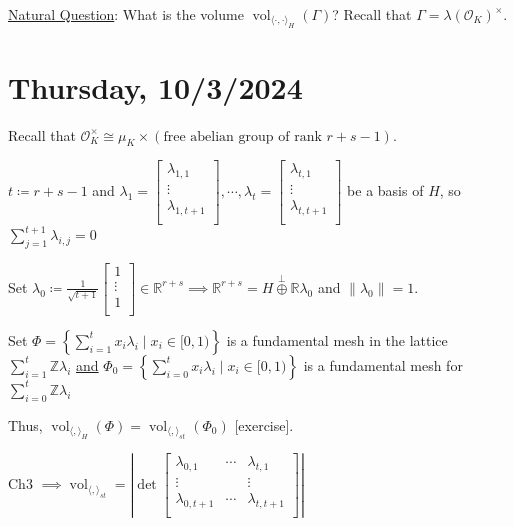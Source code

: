 \documentclass[openany]{amsbook}
\numberwithin{section}{chapter}
\theoremstyle{definition}
\begin{document}
\underline{Natural Question}: What is the volume \(\operatorname{vol}_{\langle \cdot,\cdot \rangle_H}(\Gamma)\)? Recall that \(\Gamma = \lambda (\mathcal{O}_K)^\times\). 

\section*{Thursday, 10/3/2024}

Recall that \(\mathcal{O}_K^\times \cong \mu_K \times (\text{free abelian group of rank } r+s-1)\).

\begin{center}



\end{center}

\(t\coloneqq r+s-1\) and \(\lambda_1 = \begin{bmatrix}
     \lambda_{1,1} \\
     \vdots \\
     \lambda_{1,t+1} \\
\end{bmatrix}, \cdots , \lambda _t = \begin{bmatrix}
     \lambda_{t,1} \\
     \vdots \\
     \lambda_{t,t+1} \\
\end{bmatrix}\) be a basis of \(H\), so \(\sum_{j=1}^{t+1} \lambda_{i,j} = 0 \)  

Set \(\lambda_0 \coloneqq \frac{1}{\sqrt{t+1}} \begin{bmatrix}
     1 \\
     \vdots \\
     1 \\
\end{bmatrix} \in \mathbb{R}^{r+s} \implies \mathbb{R}^{r+s} = H \overset{\perp}{\oplus} \mathbb{R} \lambda_0\) and \(\lVert \lambda_0 \rVert = 1\).

Set \(\Phi = \left\{ \sum_{i=1} ^ t x_i \lambda_i \mid x_i \in [0,1) \right\} \) is a fundamental mesh in the lattice \(\sum_{i=1}^t \mathbb{Z} \lambda_i\) \underline{and} \(\Phi_0 = \left\{ \sum_{i=0} ^ t x_i \lambda_i \mid x_i \in [0,1) \right\} \) is a fundamental mesh for \(\sum_{i=0} ^ t \mathbb{Z} \lambda_i\) 

Thus, \(\operatorname{vol}_{\langle , \rangle _H} (\Phi) =\operatorname{vol}_{\langle , \rangle_{st}}(\Phi_0)\) [exercise].

Ch3 \(\implies \operatorname{vol}_{\langle , \rangle_{s t}} = \left\vert \det \begin{bmatrix}
    \lambda_{0,1} & \cdots &  \lambda_{t,1} \\
    \vdots &  &  \vdots \\
    \lambda_{0,t+1} & \cdots &  \lambda_{t,t+1} \\
\end{bmatrix} \right\vert \) 
\end{document}
